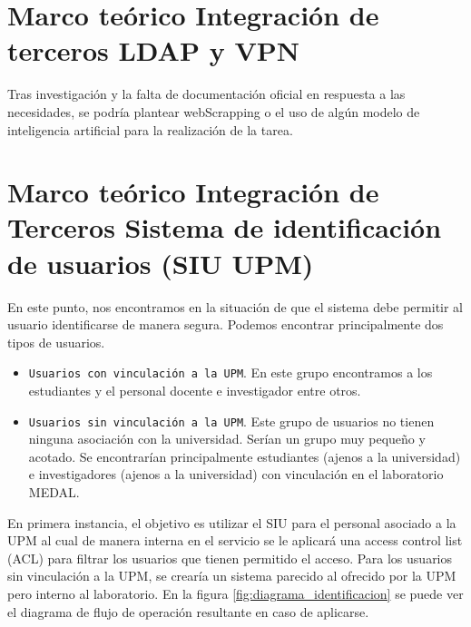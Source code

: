 \section{Marco teórico Integración de terceros LDAP y VPN}
Tras investigación y la falta de documentación oficial en respuesta a las necesidades, se podría plantear webScrapping o el uso de algún modelo de inteligencia artificial para la realización de la tarea. \cite{elconfidencial_claude_computer_use} 



\section{Marco teórico Integración de Terceros Sistema de identificación de usuarios (SIU UPM)}

En este punto, nos encontramos en la situación de que el sistema debe permitir al usuario identificarse de manera segura. Podemos encontrar principalmente dos tipos de usuarios.

 \begin{itemize}
   \item \texttt{Usuarios con vinculación a la UPM}. En este grupo encontramos a los estudiantes y el personal docente e investigador entre otros. \cite{siu_upm}
   \item \texttt{Usuarios sin vinculación a la UPM}. Este grupo de usuarios no tienen ninguna asociación con la universidad. Serían un grupo muy pequeño y acotado. Se encontrarían principalmente estudiantes (ajenos a la universidad) e investigadores (ajenos a la universidad) con vinculación en el laboratorio MEDAL.
 \end{itemize} 


En primera instancia, el objetivo es utilizar el SIU para el personal asociado a la UPM al cual de manera interna en el servicio se le aplicará una access control list (ACL) para filtrar los usuarios que tienen permitido el acceso. Para los usuarios sin vinculación a la UPM, se crearía un sistema parecido al ofrecido por la UPM pero interno al laboratorio. En la figura \ref{fig:diagrama_identificacion} se puede ver el diagrama de flujo de operación resultante en caso de aplicarse. 

